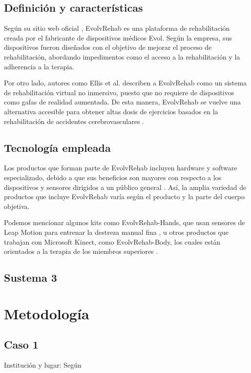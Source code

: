 \documentclass[journal]{IEEEtran}
\begin{document}
\subsection{Definición y características}
Según su sitio web oficial \cite{evolvRehab}, EvolvRehab es una plataforma de rehabilitación creada por el fabricante de dispositivos médicos Evol. Según la empresa, sus dispositivos fueron diseñados con el objetivo de mejorar el proceso de rehabilitación, abordando impedimentos como el acceso a la rehabilitación y la adherencia a la terapia.

Por otro lado, autores como Ellis et al. \cite{ellis2022consideration} describen a EvolvRehab como un sistema de rehabilitación virtual no inmersivo, puesto que no requiere de dispositivos como gafas de realidad aumentada. De esta manera, EvolvRehab se vuelve una alternativa accesible para obtener altas dosis de ejercicios basados en la rehabilitación de accidentes cerebrovasculares \cite{ellis2022consideration, evolvRehab}.

\subsection{Tecnología empleada}
Los productos que forman parte de EvolvRehab incluyen hardware y software especializado, debido a que sus beneficios son mayores con respecto a los dispositivos y sensores dirigidos a un público general \cite{maier2019effect}. Así, la amplia variedad de productos que incluye EvolvRehab varía según el producto y la parte del cuerpo objetiva.

Podemos mencionar algunos kits como EvolvRehab-Hands, que usan sensores de Leap Motion para entrenar la destreza manual fina \cite{evolvRehab}, u otros productos que trabajan con Microsoft Kinect, como EvolvRehab-Body, los cuales están orientados a la terapia de los miembros superiores \cite{ellis2022consideration}.
\subsection{Sustema 3}



\section{Metodología}
\subsection{Caso 1}
Institución y lugar: Según 
\end{document}
